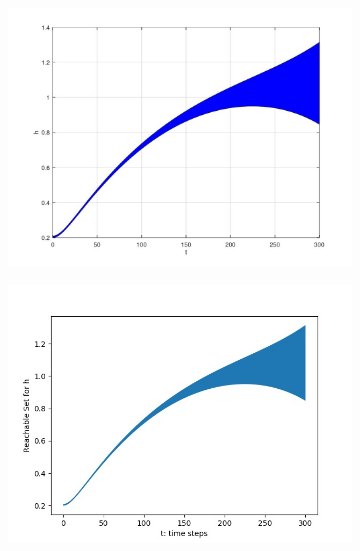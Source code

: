 \documentclass[EPiC]{easychair}
\begin{document}
\begin{figure}[h]

    \begin{subfigure}{0.5\textwidth}
    \centering
    \includegraphics[width=\textwidth]{SapoFigures/Quad/SapoQuad_H.jpg}
    \end{subfigure}
    \begin{subfigure}{0.6\textwidth}
    \centering
    \includegraphics[width=\textwidth]{SapoFigures/Quad/KaaQuad_H.jpg}
    \end{subfigure}
    

\end{figure}
\end{document}
